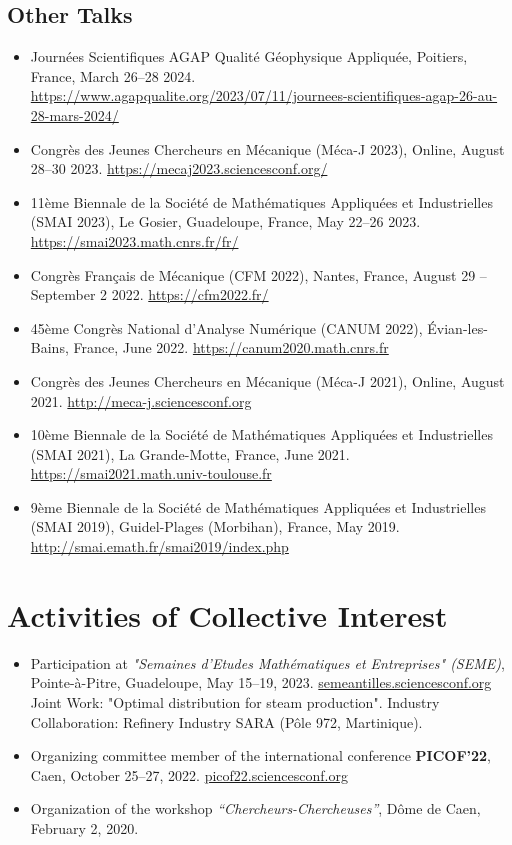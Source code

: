\documentclass[10pt]{article} %
\begin{document}
\subsection{Other Talks}
\begin{itemize}
\item Journées Scientifiques AGAP Qualité Géophysique Appliquée, Poitiers, France, March 26--28 2024. \url{https://www.agapqualite.org/2023/07/11/journees-scientifiques-agap-26-au-28-mars-2024/}
\item Congrès des Jeunes Chercheurs en Mécanique (Méca-J 2023), Online, August 28--30 2023. \url{https://mecaj2023.sciencesconf.org/}
\item 11ème Biennale de la Société de Mathématiques Appliquées et Industrielles (SMAI 2023), Le Gosier, Guadeloupe, France, May 22--26 2023. \url{https://smai2023.math.cnrs.fr/fr/}
\item Congrès Français de Mécanique (CFM 2022), Nantes, France, August 29 -- September 2 2022. \url{https://cfm2022.fr/}
\item 45ème Congrès National d'Analyse Numérique (CANUM 2022), Évian-les-Bains, France, June 2022. \url{https://canum2020.math.cnrs.fr}
\item Congrès des Jeunes Chercheurs en Mécanique (Méca-J 2021), Online, August 2021. \url{http://meca-j.sciencesconf.org}
\item 10ème Biennale de la Société de Mathématiques Appliquées et Industrielles (SMAI 2021), La Grande-Motte, France, June 2021. \url{https://smai2021.math.univ-toulouse.fr}
\item 9ème Biennale de la Société de Mathématiques Appliquées et Industrielles (SMAI 2019), Guidel-Plages (Morbihan), France, May 2019. \url{http://smai.emath.fr/smai2019/index.php}
\end{itemize}

\section{Activities of Collective Interest}

\begin{itemize}
  \item Participation at \textit{"Semaines d'Etudes Mathématiques et Entreprises" (SEME)},  
  Pointe-à-Pitre, Guadeloupe, May 15–19, 2023.  
  \href{https://semeantilles.sciencesconf.org/}{semeantilles.sciencesconf.org}  
  Joint Work: "Optimal distribution for steam production".
  Industry Collaboration: Refinery Industry SARA (Pôle 972, Martinique).

  \item Organizing committee member of the international conference \textbf{PICOF’22},  
  Caen, October 25–27, 2022.  
  \href{https://picof22.sciencesconf.org/}{picof22.sciencesconf.org}

  \item Organization of the workshop \textit{“Chercheurs-Chercheuses”},  
  Dôme de Caen, February 2, 2020.
\end{itemize}
\end{document}
